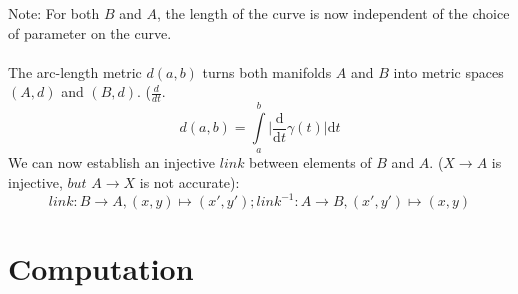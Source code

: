 \documentclass{report}
\begin{document}
Note: For both $B$ and $A$, the length of the curve is now independent of the choice of parameter on the curve. ~\cite[]{Taimanov}\\\\
The arc-length metric $d(a,b)$ turns both manifolds $A$ and $B$ into metric spaces $(A,d)$ and $(B,d)$. ($\frac{d}{dt}$. ~\cite[.3]{Klingenberg}
\begin{equation}
d(a,b) = \int \limits _{a}^{b}\lvert \frac{\mathrm{d}}{\mathrm{d}t}\gamma(t)\rvert \mathrm{d}t
\end{equation}
We can now establish an injective $link$ between elements of $B$ and $A$. ($X \rightarrow A$ is injective, $but$ $A \rightarrow X$ is not accurate):
\begin{equation}
link: B \rightarrow A, (x,y) \mapsto (x',y'); link^{-1}: A \rightarrow B, (x',y') \mapsto (x,y)
\end{equation}

\chapter{Computation}
\end{document}
